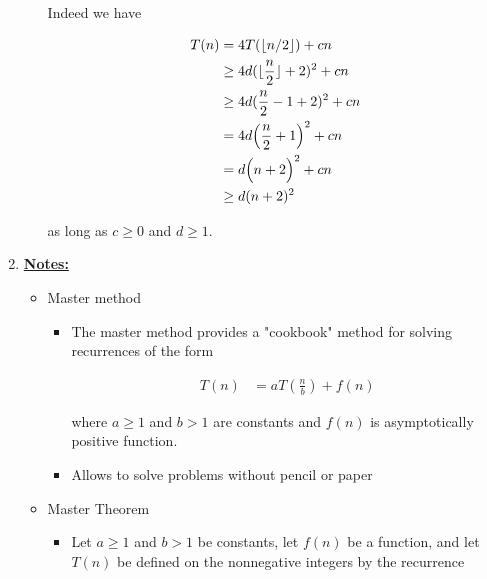 \documentclass[12pt]{article}
\begin{document}
\begin{enumerate}[1.]
\begin{enumerate}[1.]
\begin{mdframed}
        \bigskip

        Indeed we have

        \begin{align}
            T(n) &= 4T(\lfloor n/2 \rfloor) + cn\\
            &\geq 4d (\lfloor \frac{n}{2} \rfloor + 2)^2 + cn\\
            &\geq 4d (\frac{n}{2} - 1 + 2)^2 + cn\\
            &= 4d \Bigl( \frac{n}{2} + 1 \Bigr)^2 + cn\\
            &= d \Bigl( n + 2 \Bigr)^2 + cn\\
            &\geq d(n+2)^2
        \end{align}

        \bigskip

        as long as $c \geq 0$ and $d \geq 1$.

        \end{mdframed}

    \end{enumerate}

    \item
    \setcounter{equation}{0}
    \bigskip

    \underline{\textbf{Notes:}}

    \bigskip

    \begin{itemize}
        \item Master method

        \begin{itemize}
            \item The master method provides a "cookbook" method for solving recurrences of the
            form


            \begin{align}
                T(n) &= aT(\frac{n}{b}) + f(n)
            \end{align}

            where $a \geq 1$ and $b > 1$ are constants and $f(n)$ is asymptotically positive function.

            \item Allows to solve problems without pencil or paper

        \end{itemize}

        \item Master Theorem

        \begin{itemize}
            \item Let $a \geq 1$ and $b > 1$ be constants, let $f(n)$ be a function, and
            let $T(n)$ be defined on the nonnegative integers by the recurrence


\end{itemize}
\end{itemize}
\end{enumerate}
\end{document}
